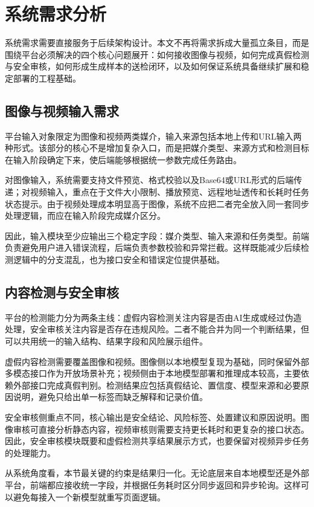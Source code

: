 \section{系统需求分析}

系统需求需要直接服务于后续架构设计。本文不再将需求拆成大量孤立条目，而是围绕平台必须解决的四个核心问题展开：如何接收图像与视频，如何完成真假检测与安全审核，如何形成生成样本的送检闭环，以及如何保证系统具备继续扩展和稳定部署的工程基础。

\subsection{图像与视频输入需求}

平台输入对象限定为图像和视频两类媒介，输入来源包括本地上传和URL输入两种形式。该部分的核心不是增加复杂入口，而是把媒介类型、来源方式和检测目标在输入阶段确定下来，使后端能够根据统一参数完成任务路由。

对图像输入，系统需要支持文件预览、格式校验以及Base64或URL形式的后端传递；对视频输入，重点在于文件大小限制、播放预览、远程地址透传和长耗时任务状态提示。由于视频处理成本明显高于图像，系统不应把二者完全放入同一套同步处理逻辑，而应在输入阶段完成媒介区分。

因此，输入模块至少应输出三个稳定字段：媒介类型、输入来源和任务类型。前端负责避免用户进入错误流程，后端负责参数校验和异常拦截。这样既能减少后续检测逻辑中的分支混乱，也为接口安全和错误定位提供基础。

\subsection{内容检测与安全审核}

平台的检测能力分为两条主线：虚假内容检测关注内容是否由AI生成或经过伪造处理，安全审核关注内容是否存在违规风险。二者不能合并为同一个判断结果，但可以共用统一的输入结构、结果字段和风险展示组件。

虚假内容检测需要覆盖图像和视频。图像侧以本地模型复现为基础，同时保留外部多模态接口作为开放场景补充；视频侧由于本地模型部署和推理成本较高，主要依赖外部接口完成真假判别。检测结果应包括真假结论、置信度、模型来源和必要原因说明，避免只给出单一标签而缺乏解释和记录价值。

安全审核侧重点不同，核心输出是安全结论、风险标签、处置建议和原因说明。图像审核可直接分析静态内容，视频审核则需要支持更长耗时和更复杂的接口状态。因此，安全审核模块既要和虚假检测共享结果展示方式，也要保留对视频异步任务的处理能力。

从系统角度看，本节最关键的约束是结果归一化。无论底层来自本地模型还是外部平台，前端都应接收统一字段，并根据任务耗时区分同步返回和异步轮询。这样可以避免每接入一个新模型就重写页面逻辑。

